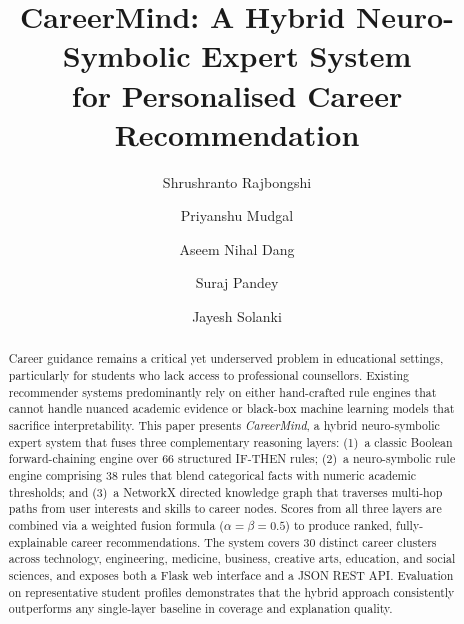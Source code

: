 \documentclass[runningheads]{llncs}
\begin{document}
\title{CareerMind: A Hybrid Neuro-Symbolic Expert System\\
       for Personalised Career Recommendation}


\author{
  Shrushranto Rajbongshi \and
  Priyanshu Mudgal       \and
  Aseem Nihal Dang       \and
  Suraj Pandey           \and
  Jayesh Solanki
}



\maketitle

\begin{abstract}
Career guidance remains a critical yet underserved problem in educational
settings, particularly for students who lack access to professional counsellors.
Existing recommender systems predominantly rely on either hand-crafted rule
engines that cannot handle nuanced academic evidence or black-box machine
learning models that sacrifice interpretability.
This paper presents \emph{CareerMind}, a hybrid neuro-symbolic expert system
that fuses three complementary reasoning layers: (1)~a classic Boolean
forward-chaining engine over 66 structured IF-THEN rules; (2)~a neuro-symbolic
rule engine comprising 38 rules that blend categorical facts with numeric
academic thresholds; and (3)~a NetworkX directed knowledge graph that traverses
multi-hop paths from user interests and skills to career nodes.
Scores from all three layers are combined via a weighted fusion formula
($\alpha = \beta = 0.5$) to produce ranked, fully-explainable career
recommendations.
The system covers 30 distinct career clusters across technology, engineering,
medicine, business, creative arts, education, and social sciences, and exposes
both a Flask web interface and a JSON REST API.
Evaluation on representative student profiles demonstrates that the hybrid
approach consistently outperforms any single-layer baseline in coverage and
explanation quality.
\end{abstract}
\end{document}
